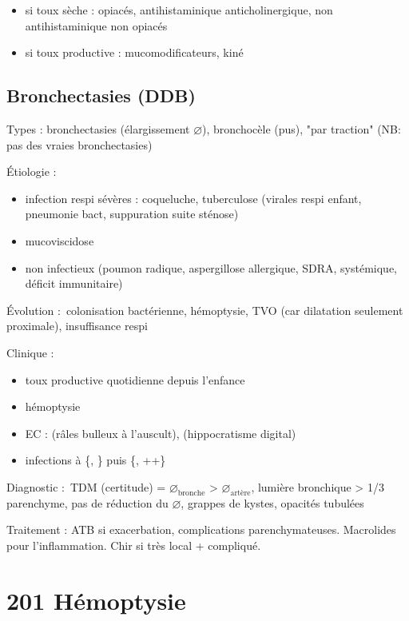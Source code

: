 \documentclass{book}
\begin{document}
\begin{itemize}
\item si toux sèche : opiacés, antihistaminique anticholinergique, non
antihistaminique non opiacés
\item si toux productive : mucomodificateurs, kiné
\end{itemize}


\subsection{Bronchectasies (DDB)}
\label{sec:orgb567642}
\label{sub:bronchectasies}
Types : bronchectasies (élargissement \(\diameter\)), bronchocèle (pus), "par
traction" (NB: pas des vraies bronchectasies)

Étiologie :

\begin{itemize}
\item infection respi sévères : coqueluche, tuberculose (virales respi enfant,
pneumonie bact, suppuration suite sténose)
\item mucoviscidose
\item non infectieux (poumon radique, aspergillose allergique, SDRA,
systémique, déficit immunitaire)
\end{itemize}

Évolution : colonisation bactérienne, hémoptysie, TVO (car dilatation seulement
proximale), insuffisance respi

Clinique :

\begin{itemize}
\item toux productive quotidienne depuis l'enfance
\item hémoptysie
\item EC : (râles bulleux à l'auscult), (hippocratisme digital)
\item infections à \{, \} puis \{,
++\}
\end{itemize}


Diagnostic : TDM (certitude) = \(\diameter_\text{bronche}\) > \(\diameter_\text{artère}\), lumière
bronchique > 1/3 parenchyme, pas de réduction du \(\diameter\), grappes de kystes,
opacités tubulées

Traitement : ATB si exacerbation, complications parenchymateuses. Macrolides
pour l'inflammation. Chir si très local + compliqué.

\section{201 \textdagger{} Hémoptysie}
\label{sec:orgf6c167a}
\label{sec:201_hemoptysie}
\end{document}
